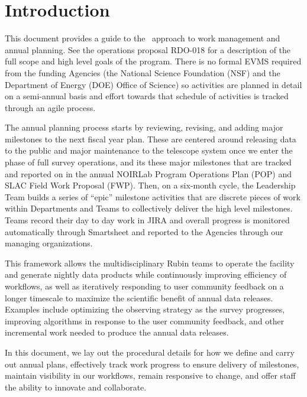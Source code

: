 \section{Introduction}

This document provides a guide to the \VRO\ approach to work management and annual planning.
See the operations proposal \gls{RDO}-018 for a description of the full scope and high level goals of the program.
There is no formal \gls{EVMS} required from the funding Agencies (the \gls{National Science Foundation} (\gls{NSF}) and the \gls{Department of Energy} (DOE) Office of Science) so activities are planned in detail on a semi-annual basis and effort towards that schedule of activities is tracked through an agile process.

The annual planning process starts by reviewing, revising, and adding major milestones to the next fiscal year plan.
These are centered around releasing data to the public and major maintenance to the telescope system once we enter the phase of full survey operations, and its these major milestones that are tracked and reported on in the annual \gls{NOIRLab} Program Operations Plan (\gls{POP}) and \gls{SLAC} Field Work Proposal (FWP).
Then, on a six-month \gls{cycle}, the Leadership Team builds a series of ``epic'' milestone activities that are discrete pieces of work within Departments and Teams to collectively deliver the high level milestones.
Teams record their day to day work in \gls{JIRA} and overall progress is monitored automatically through Smartsheet and reported to the Agencies through our managing organizations.

This framework allows the multidisciplinary Rubin teams to operate the facility and generate nightly data products while continuously improving efficiency of workflows,
as well as iteratively responding to user community feedback on a longer timescale to maximize the scientific benefit of annual data releases.
Examples include optimizing the observing strategy as the survey progresses, improving algorithms in response to the user community feedback,
and other incremental work needed to produce the annual data releases.

In this document, we lay out the procedural details for how we define and carry out annual plans, effectively track work progress to ensure delivery of milestones, maintain visibility in our workflows, remain responsive to change, and offer staff the ability to innovate and collaborate.


